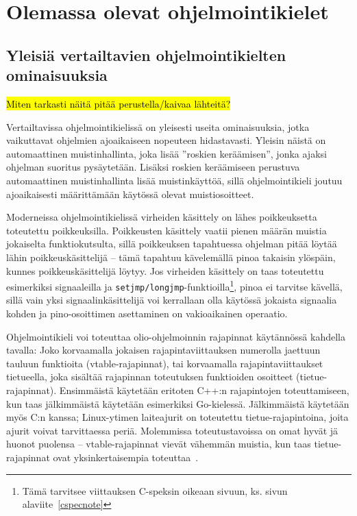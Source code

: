 \section{Olemassa olevat ohjelmointikielet}

\subsection{Yleisiä vertailtavien ohjelmointikielten ominaisuuksia}

\hl{Miten tarkasti näitä pitää perustella/kaivaa lähteitä?}

Vertailtavissa ohjelmointikielissä on yleisesti useita ominaisuuksia, jotka
vaikuttavat ohjelmien ajoaikaiseen nopeuteen hidastavasti. Yleisin näistä on
automaattinen muistinhallinta, joka lisää ''roskien
keräämisen'', jonka ajaksi ohjelman suoritus
pysäytetään. Lisäksi roskien keräämiseen perustuva automaattinen
muistinhallinta lisää muistinkäyttöä, sillä ohjelmointikieli joutuu
ajoaikaisesti määrittämään käytössä olevat muistiosoitteet.

Moderneissa ohjelmointikielissä virheiden käsittely on lähes poikkeuksetta
toteutettu poikkeuksilla. Poikkeusten käsittely vaatii pienen määrän muistia
jokaiselta funktiokutsulta, sillä poikkeuksen tapahtuessa ohjelman pitää löytää
lähin poikkeuskäsittelijä -- tämä tapahtuu kävelemällä pinoa takaisin ylöspäin,
kunnes poikkeuskäsittelijä löytyy. Jos virheiden käsittely on taas toteutettu
esimerkiksi signaaleilla ja \texttt{setjmp/longjmp}-funktioilla\footnote{Tämä
tarvitsee viittauksen C-speksin oikeaan sivuun, ks. sivun~\pageref{cspecnote}
alaviite~\ref{cspecnote}}, pinoa ei tarvitse kävellä, sillä vain yksi
signaalinkäsittelijä voi kerrallaan olla käytössä jokaista signaalia kohden ja
pino-osoittimen asettaminen on vakioaikainen operaatio.

Ohjelmointikieli voi toteuttaa olio-ohjelmoinnin rajapinnat käytännössä kahdella
tavalla: Joko korvaamalla jokaisen rajapintaviittauksen numerolla jaettuun
tauluun funktioita (vtable-rajapinnat), tai korvaamalla rajapintaviittaukset
tietueella, joka sisältää rajapinnan toteutuksen funktioiden osoitteet
(tietue-rajapinnat).  Ensimmäistä käytetään eritoten C++:n rajapintojen
toteuttamiseen, kun taas jälkimmäistä käytetään esimerkiksi Go-kielessä.
Jälkimmäistä käytetään myös C:n kanssa; Linux-ytimen laiteajurit on toteutettu
tietue-rajapintoina, joita ajurit voivat tarvittaessa periä. Molemmissa
toteutustavoissa on omat hyvät jä huonot puolensa -- vtable-rajapinnat vievät
vähemmän muistia, kun taas tietue-rajapinnat ovat yksinkertaisempia
toteuttaa~\citationneeded.

